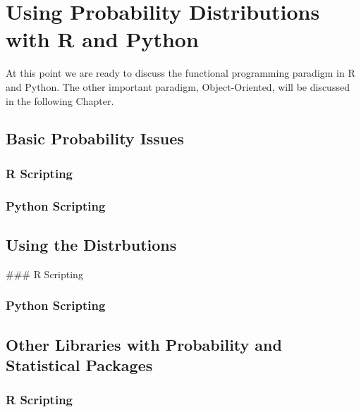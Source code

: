 \documentclass[]{book}
\theoremstyle{definition}
\theoremstyle{definition}
\theoremstyle{definition}
\theoremstyle{remark}
\begin{document}

\chapter{Using Probability Distributions with R and
Python}\label{using-probability-distributions-with-r-and-python}

At this point we are ready to discuss the functional programming
paradigm in R and Python. The other important paradigm, Object-Oriented,
will be discussed in the following Chapter.

\section{Basic Probability Issues}\label{basic-probability-issues}


\subsection{R Scripting}\label{r-scripting-5}

\subsection{Python Scripting}\label{python-scripting-5}

\section{Using the Distrbutions}\label{using-the-distrbutions}

 \#\#\# R Scripting

\subsection{Python Scripting}\label{python-scripting-6}

\section{Other Libraries with Probability and Statistical
Packages}\label{other-libraries-with-probability-and-statistical-packages}

\subsection{R Scripting}\label{r-scripting-6}
\end{document}
